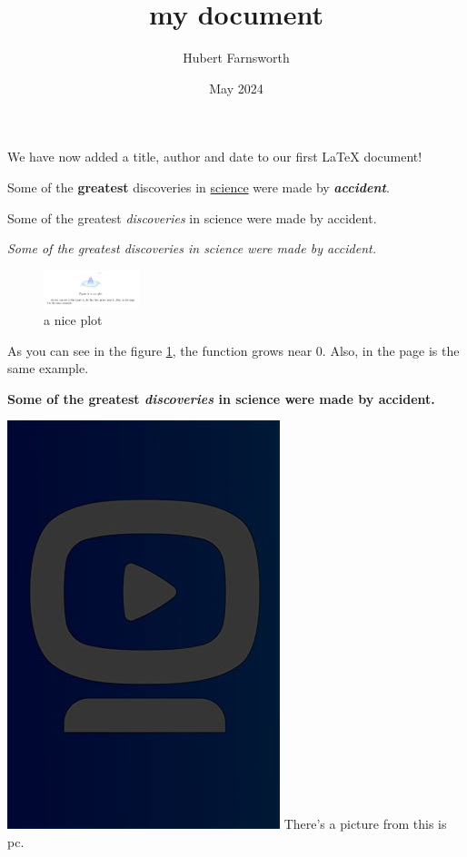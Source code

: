 \documentclass[12pt, a4paper]{article}
\title{my document}
\author{Hubert Farnsworth}
\date{May 2024}
\begin{document}
\maketitle

We have now added a title, author and date to our first \LaTeX{} document!

Some of the \textbf{greatest}
discoveries in \underline{science}
were made by \textbf{\textit{accident}}.

Some of the greatest \emph{discoveries}
in science
were made by accident.

\textit{Some of the greatest \emph{discoveries}
in science
were made by accident.}

\begin{figure}[h]
	\centering
	\includegraphics[width=0.25\textwidth]{mesh}
	\caption{a nice plot}
	\label{fig:mesh1}
\end{figure}

As you can see in the figure 
\ref{fig:mesh1}, the function grows near 0. Also, in the page \pageref{fig:mesh1} is the same example.

\textbf{Some of the greatest \emph{discoveries}
in science
were made by accident.}

\includegraphics{photo}
There's a picture from this is pc.
\end{document}
